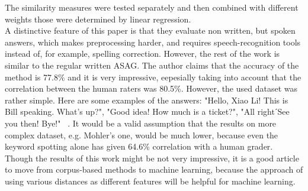 The similarity measures were tested separately and then combined with different weights those were determined by linear regression.\\

A distinctive feature of this paper is that they evaluate non written, but spoken answers, which makes preprocessing harder, and requires speech-recognition tools instead of, for example, spelling correction. However, the rest of the work is similar to the regular written ASAG. The author claims that the accuracy of the method is 77.8\% and it is very impressive, eepesially taking into account that the correlation between the human raters was 80.5\%. However, the used dataset was rather simple. Here are some examples of the answers: "Hello, Xiao Li! This is Bill speaking. What's up?", "Good idea! How much is a ticket?", "All rightˊSee you then! Bye!" ~\cite{Li}. It would be a valid assumption that the results on more complex dataset, e.g. Mohler's one, would be much lower, because even the keyword spotting alone has given 64.6\% correlation with a human grader. Though the results of this work might be not very impressive, it is a good article to move from corpus-based methods to machine learning, because the approach of using various distances as different features will be helpful for machine learning.\\

